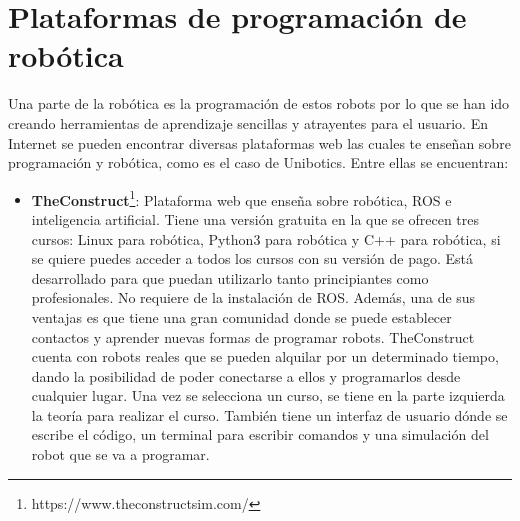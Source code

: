 \section{Plataformas de programación de robótica}
Una parte de la robótica es la programación de estos robots por lo que se han ido creando herramientas de aprendizaje sencillas y atrayentes para el usuario. En Internet se pueden encontrar diversas plataformas web las cuales te enseñan sobre programación y robótica, como es el caso de Unibotics. Entre ellas se encuentran:

\begin{itemize}
\item \textbf{TheConstruct}\footnote{https://www.theconstructsim.com/}: Plataforma web que enseña sobre robótica, ROS e inteligencia artificial. Tiene una versión gratuita en la que se ofrecen tres cursos: Linux para robótica, Python3 para robótica y C++ para robótica, si se quiere puedes acceder a todos los cursos con su versión de pago. Está desarrollado para que puedan utilizarlo tanto principiantes como profesionales. No requiere de la instalación de ROS. Además, una de sus ventajas es que tiene una gran comunidad donde se puede establecer contactos y aprender nuevas formas de programar robots. TheConstruct cuenta con robots reales que se pueden alquilar por un determinado tiempo, dando la posibilidad de poder conectarse a ellos y programarlos desde cualquier lugar. Una vez se selecciona un curso, se tiene en la parte izquierda la teoría para realizar el curso. También tiene un interfaz de usuario dónde se escribe el código, un terminal para escribir comandos y una simulación del robot que se va a programar.


\end{itemize}
